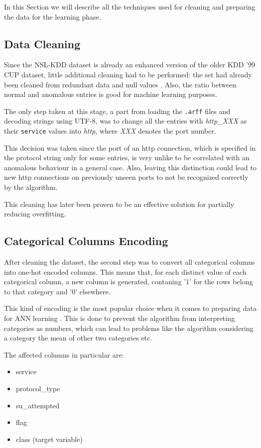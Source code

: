 In this Section we will describe all the techniques used for cleaning and preparing the data for the learning phase.

\subsection{Data Cleaning}

Since the NSL-KDD dataset is already an enhanced version of the older KDD '99 CUP dataset, little additional cleaning had to be performed: the set had already been cleaned from redundant data and null values \cite{nslkdd}. Also, the ratio between normal and anomalous entries is good for machine learning purposes.

The only step taken at this stage, a part from loading the \texttt{.arff} files and decoding strings using UTF-8, was to change all the entries with \textit{http\_XXX} as their  \texttt{service} values into \textit{http}, where \textit{XXX} denotes the port number.

This decision was taken since the port of an http connection, which is specified in the protocol string only for some entries, is very unlike to be correlated with an anomalous behaviour in a general case. Also, leaving this distinction could lead to new http connections on previously unseen ports to not be recognized correctly by the algorithm.

This cleaning has later been proven to be an effective solution for partially reducing overfitting.

\subsection{Categorical Columns Encoding}

After cleaning the dataset, the second step was to convert all categorical columns into one-hot encoded columns. This means that, for each distinct value of each categorical column, a new column is generated, contaning '1' for the rows belong to that category and '0' elsewhere.

This kind of encoding is the most popular choice when it comes to preparing data for ANN learning \cite{encoding}. This is done to prevent the algorithm from interpreting categories as numbers, which can lead to problems like the algorithm considering a category the mean of other two categories etc.

The affected columns in particular are:

\begin{itemize}
    \item service
    \item protocol\_type
    \item su\_attempted
    \item flag
    \item class (target variable)
\end{itemize}

